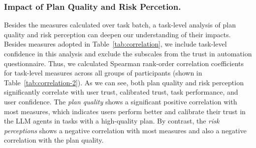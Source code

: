 \subsubsection{Impact of Plan Quality and Risk Percetion.} Besides the measures calculated over task batch, a task-level 
analysis of plan quality and risk perception can deepen our understanding of their impacts. 
Besides measures adopted in Table~\ref{tab:correlation}, we include task-level confidence in this analysis and exclude the subscales from the trust in automation questionnaire.
Thus, we calculated Spearman rank-order correlation coefficients for task-level measures across all groups of participants (shown in Table~\ref{tab:correlation-2}). 
As we can see, both plan quality and risk perception significantly correlate with user trust, calibrated trust, task performance, and user confidence. 
The \textit{plan quality} shows a significant positive correlation with most measures, which indicates users perform better and calibrate their trust in the LLM agents in tasks with a high-quality plan. 
By contrast, the \textit{risk perceptions} shows a negative correlation with most measures and also a negative correlation with the plan quality. %

